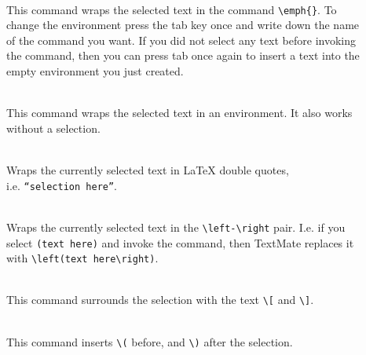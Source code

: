 \documentclass[11pt, x11names]{article}
\begin{document}
\begin{description}

  \item[]~\hfill~\\

  This command wraps the selected text in the command \texttt{\textbackslash{}emph\{\}}. To change the environment press the tab key once and write down the name of the command you want. If you did not select any text before invoking the command, then you can press tab once again to insert a text into the empty environment you just created.

  \item[]~\hfill~\\

  This command wraps the selected text in an environment. It also works without a selection.

  \item[]~\hfill~\\

  Wraps the currently selected text in LaTeX double quotes,\\
  i.e. \texttt{``selection here''}.

  \item[]~\hfill~\\

  Wraps the currently selected text in the \texttt{\textbackslash{}left-\textbackslash{}right} pair. I.e. if you select \texttt{(text\ here)} and invoke the command, then TextMate replaces it with \texttt{\textbackslash{}left(text\ here\textbackslash{}right)}.

  \item[]~\hfill~\\

  This command surrounds the selection with the text \texttt{\textbackslash{}{[}} and \texttt{\textbackslash{}{]}}.

  \item[]~\hfill~\\

  This command inserts \texttt{\textbackslash{}(} before, and \texttt{\textbackslash{})} after the selection.

\end{description}
\end{document}
